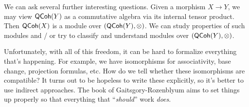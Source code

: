 \documentclass{amsart}
\begin{document}
We can ask several further interesting questions.
Given a morphism $X \to Y$, we may view $\mathsf{QCoh}(Y)$ as a commutative algebra via its internal tensor product.
Then $\mathsf{QCoh}(X)$ is a module over $(\mathsf{QCoh}(Y), \otimes)$.
We can study properties of such modules and / or try to classify and understand modules over $(\mathsf{QCoh}(Y), \otimes)$.

Unfortunately, with all of this freedom, it can be hard to formalize everything that's happening.
For example, we have isomorphisms for associativity, base change, projection formulas, etc.
How do we tell whether these isomorphisms are compatible?
It turns out to be hopeless to write these explicitly, so it's better to use indirect approaches.
The book of Gaitsgory-Rozenblyum aims to set things up properly so that everything that ``\emph{should}'' work \emph{does}.
\end{document}
